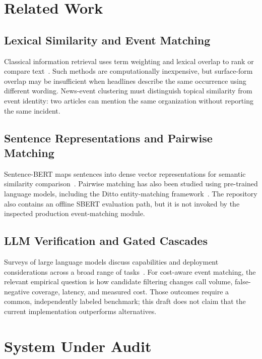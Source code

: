 \documentclass[sigconf,natbib=true,anonymous=true]{acmart}
\begin{document}
\section{Related Work}

\subsection{Lexical Similarity and Event Matching}
Classical information retrieval uses term weighting and lexical overlap to rank or compare text~\cite{salton1988,aggarwal2012}. Such methods are computationally inexpensive, but surface-form overlap may be insufficient when headlines describe the same occurrence using different wording. News-event clustering must distinguish topical similarity from event identity: two articles can mention the same organization without reporting the same incident.

\subsection{Sentence Representations and Pairwise Matching}

Sentence-BERT maps sentences into dense vector representations for semantic similarity comparison~\cite{reimers2019sentence}. Pairwise matching has also been studied using pre-trained language models, including the Ditto entity-matching framework~\cite{li2020ditto}.
The repository also contains an offline SBERT evaluation path, but it is not invoked by the inspected production event-matching module.

\subsection{LLM Verification and Gated Cascades}
Surveys of large language models discuss capabilities and deployment considerations across a broad range of tasks~\cite{zhao2023}. For cost-aware event matching, the relevant empirical question is how candidate filtering changes call volume, false-negative coverage, latency, and measured cost. Those outcomes require a common, independently labeled benchmark; this draft does not claim that the current implementation outperforms alternatives.

\section{System Under Audit}
\end{document}
